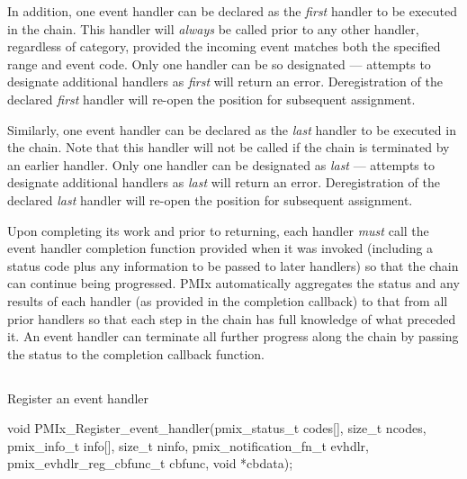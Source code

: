 In addition, one event handler can be declared as the \textit{first} handler to be executed in the chain. This handler will \textit{always} be called prior to any other handler, regardless of category, provided the incoming event matches both the specified range and event code. Only one handler can be so designated --- attempts to designate additional handlers as \textit{first} will return an error. Deregistration of the declared \textit{first} handler will re-open the position for subsequent assignment.

Similarly, one event handler can be declared as the \textit{last} handler to be executed in the chain. Note that this handler will not be called if the chain is terminated by an earlier handler. Only one handler can be designated as \textit{last} --- attempts to designate additional handlers as \textit{last} will return an error. Deregistration of the declared \textit{last} handler will re-open the position for subsequent assignment.

Upon completing its work and prior to returning, each handler \textit{must} call the event handler completion function provided when it was invoked (including a status code plus any information to be passed to later handlers) so that the chain can continue being progressed. \ac{PMIx} automatically aggregates the status and any results of each handler (as provided in the completion callback) to that from all prior handlers so that each step in the chain has full knowledge of what preceded it. An event handler can terminate all further progress along the chain by passing the  status to the completion callback function.


\subsection{}

\summary

Register an event handler

\format

\cspecificstart
\begin{codepar}
void
PMIx_Register_event_handler(pmix_status_t codes[], size_t ncodes,
                            pmix_info_t info[], size_t ninfo,
                            pmix_notification_fn_t evhdlr,
                            pmix_evhdlr_reg_cbfunc_t cbfunc,
                            void *cbdata);
\end{codepar}
\cspecificend

